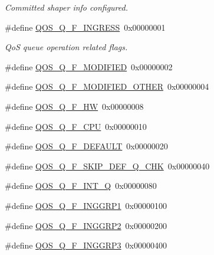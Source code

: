 \begin{DoxyCompactItemize}
\begin{DoxyCompactList}\small\item\em Committed shaper info configured. \end{DoxyCompactList}\item 
\#define \hyperlink{group__FAPI__QOS__QUEUE_ga7306e528452e4389e8c7a76dbbf3af64}{Q\-O\-S\-\_\-\-Q\-\_\-\-F\-\_\-\-I\-N\-G\-R\-E\-S\-S}~0x00000001
\begin{DoxyCompactList}\small\item\em Qo\-S queue operation related flags. \end{DoxyCompactList}\item 
\#define \hyperlink{group__FAPI__QOS__QUEUE_ga34dba99f30e84ea75cab31c31f353fdf}{Q\-O\-S\-\_\-\-Q\-\_\-\-F\-\_\-\-M\-O\-D\-I\-F\-I\-E\-D}~0x00000002
\item 
\#define \hyperlink{group__FAPI__QOS__QUEUE_ga9a1077936ad9252e2a13501b25732c2e}{Q\-O\-S\-\_\-\-Q\-\_\-\-F\-\_\-\-M\-O\-D\-I\-F\-I\-E\-D\-\_\-\-O\-T\-H\-E\-R}~0x00000004
\item 
\#define \hyperlink{group__FAPI__QOS__QUEUE_gab3c92215e835050ca004780f75f95409}{Q\-O\-S\-\_\-\-Q\-\_\-\-F\-\_\-\-H\-W}~0x00000008
\item 
\#define \hyperlink{group__FAPI__QOS__QUEUE_gad3de124faf55138ec673ff88700b70e9}{Q\-O\-S\-\_\-\-Q\-\_\-\-F\-\_\-\-C\-P\-U}~0x00000010
\item 
\#define \hyperlink{group__FAPI__QOS__QUEUE_ga3daab7eabb364df508e0cffdafc716b1}{Q\-O\-S\-\_\-\-Q\-\_\-\-F\-\_\-\-D\-E\-F\-A\-U\-L\-T}~0x00000020
\item 
\#define \hyperlink{group__FAPI__QOS__QUEUE_ga23373ec976d76acc26ae4b7a13a5490e}{Q\-O\-S\-\_\-\-Q\-\_\-\-F\-\_\-\-S\-K\-I\-P\-\_\-\-D\-E\-F\-\_\-\-Q\-\_\-\-C\-H\-K}~0x00000040
\item 
\#define \hyperlink{group__FAPI__QOS__QUEUE_ga3ff77637a60ecb38f8b370157f43ac4a}{Q\-O\-S\-\_\-\-Q\-\_\-\-F\-\_\-\-I\-N\-T\-\_\-\-Q}~0x00000080
\item 
\#define \hyperlink{group__FAPI__QOS__QUEUE_gaccc096a1afc94084de913a8de593cd7a}{Q\-O\-S\-\_\-\-Q\-\_\-\-F\-\_\-\-I\-N\-G\-G\-R\-P1}~0x00000100
\item 
\#define \hyperlink{group__FAPI__QOS__QUEUE_gab6da64324452e6385a5a045e438240cb}{Q\-O\-S\-\_\-\-Q\-\_\-\-F\-\_\-\-I\-N\-G\-G\-R\-P2}~0x00000200
\item 
\#define \hyperlink{group__FAPI__QOS__QUEUE_ga1de29a6e534286eb607bf16191d8d94b}{Q\-O\-S\-\_\-\-Q\-\_\-\-F\-\_\-\-I\-N\-G\-G\-R\-P3}~0x00000400
\item 

\end{DoxyCompactItemize}
